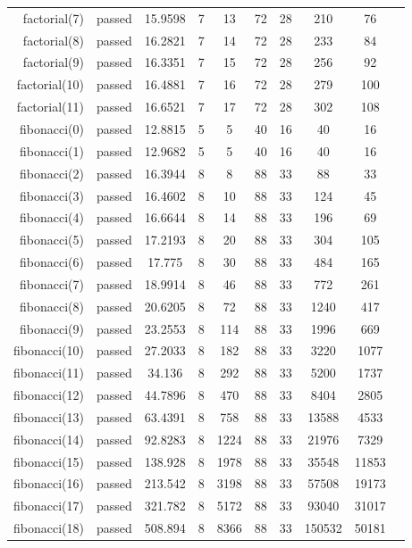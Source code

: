 \begin{longtable}{r|ccccccccc}
    factorial(7) & passed & 15.9598 & 7 & 13 & 72 & 28 & 210 & 76 \\
    factorial(8) & passed & 16.2821 & 7 & 14 & 72 & 28 & 233 & 84 \\
    factorial(9) & passed & 16.3351 & 7 & 15 & 72 & 28 & 256 & 92 \\
    factorial(10) & passed & 16.4881 & 7 & 16 & 72 & 28 & 279 & 100 \\
    factorial(11) & passed & 16.6521 & 7 & 17 & 72 & 28 & 302 & 108 \\
    fibonacci(0) & passed & 12.8815 & 5 & 5 & 40 & 16 & 40 & 16 \\
    fibonacci(1) & passed & 12.9682 & 5 & 5 & 40 & 16 & 40 & 16 \\
    fibonacci(2) & passed & 16.3944 & 8 & 8 & 88 & 33 & 88 & 33 \\
    fibonacci(3) & passed & 16.4602 & 8 & 10 & 88 & 33 & 124 & 45 \\
    fibonacci(4) & passed & 16.6644 & 8 & 14 & 88 & 33 & 196 & 69 \\
    fibonacci(5) & passed & 17.2193 & 8 & 20 & 88 & 33 & 304 & 105 \\
    fibonacci(6) & passed & 17.775 & 8 & 30 & 88 & 33 & 484 & 165 \\
    fibonacci(7) & passed & 18.9914 & 8 & 46 & 88 & 33 & 772 & 261 \\
    fibonacci(8) & passed & 20.6205 & 8 & 72 & 88 & 33 & 1240 & 417 \\
    fibonacci(9) & passed & 23.2553 & 8 & 114 & 88 & 33 & 1996 & 669 \\
    fibonacci(10) & passed & 27.2033 & 8 & 182 & 88 & 33 & 3220 & 1077 \\
    fibonacci(11) & passed & 34.136 & 8 & 292 & 88 & 33 & 5200 & 1737 \\
    fibonacci(12) & passed & 44.7896 & 8 & 470 & 88 & 33 & 8404 & 2805 \\
    fibonacci(13) & passed & 63.4391 & 8 & 758 & 88 & 33 & 13588 & 4533 \\
    fibonacci(14) & passed & 92.8283 & 8 & 1224 & 88 & 33 & 21976 & 7329 \\
    fibonacci(15) & passed & 138.928 & 8 & 1978 & 88 & 33 & 35548 & 11853 \\
    fibonacci(16) & passed & 213.542 & 8 & 3198 & 88 & 33 & 57508 & 19173 \\
    fibonacci(17) & passed & 321.782 & 8 & 5172 & 88 & 33 & 93040 & 31017 \\
    fibonacci(18) & passed & 508.894 & 8 & 8366 & 88 & 33 & 150532 & 50181 \\

\end{longtable}
